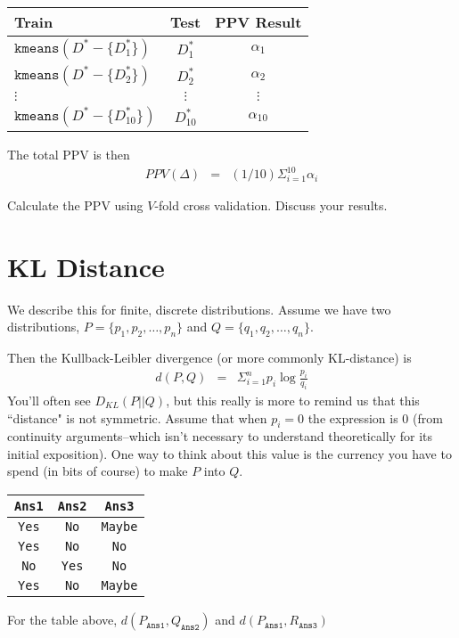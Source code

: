 \documentclass{article}
\begin{document}
\begin{enumerate}
\begin{center}
\begin{tabular}{l||c|c}
\textsf{Train} & \textsf{Test} & \textsf{PPV Result}\\ \hline \hline 
$\texttt{kmeans}(D^* - \{ D_1^*\})$    & $D_1^*$   &$\alpha_1 $\\
$\texttt{kmeans}(D^* - \{ D_2^*\})$    & $D_2^*$    & $\alpha_2$\\
$\vdots$              & $\vdots$   & $\vdots$  \\
$\texttt{kmeans}(D^* - \{ D_{10}^*\})$    & $D_{10}^*$    & $\alpha_{10}$\\
\end{tabular}
\end{center}

The total PPV is then 
\begin{eqnarray}
 PPV(\Delta) &=& (1/10)\Sigma_{i=1}^{10} \alpha_i
\end{eqnarray}
 \end{enumerate}
Calculate the PPV using $V$-fold cross validation.  Discuss your results.
\section{KL Distance}
We describe this for finite, discrete distributions.  Assume we have two distributions, $P = \{p_1, p_2, \ldots, p_n\}$ and $Q = \{q_1, q_2, \ldots, q_n\}$.

Then the Kullback-Leibler divergence (or more commonly KL-distance) is
\begin{eqnarray*}
d(P,Q) &=& \Sigma_{i=1}^n p_i \log \frac{p_i}{q_i}
\end{eqnarray*}
You'll often see $D_{KL}(P||Q)$, but this really is more to remind us that this ``distance" is not symmetric.  Assume that when $p_i =0$ the expression is 0 (from continuity arguments--which isn't necessary to understand theoretically  for its initial exposition).  One way to think about this value is the currency you have to spend (in bits of course) to make $P$ into $Q$.
\begin{center}
\begin{tabular}{ccc}
\texttt{Ans1} & \texttt{Ans2} & \texttt{Ans3} \\ \hline
\texttt{Yes} & \texttt{No} & \texttt{Maybe} \\
\texttt{Yes} & \texttt{No} & \texttt{No} \\
\texttt{No} & \texttt{Yes} & \texttt{No} \\
\texttt{Yes} & \texttt{No} & \texttt{Maybe} 
\end{tabular}
\end{center}
 For the table above, $d(P_{\texttt{Ans1}}, Q_{\texttt{Ans2}})$ and $d(P_{\texttt{Ans1}}, R_{\texttt{Ans3}})$
\end{document}
